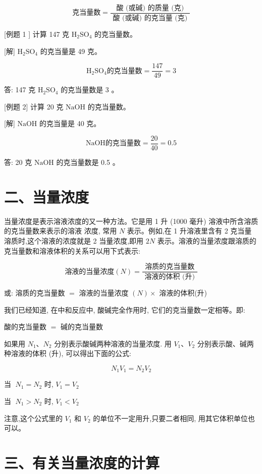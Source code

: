 \documentclass[10pt]{article}
\begin{document}
\[
\text{克当量数} = \frac{\text{ 酸 (或碱) 的质量 (克) }}{\text{ 酸 (或碱) 的克当量 (克) }}
\]

[例题 1 ] 计算 147 克 \({\mathrm{H}}_{2}{\mathrm{{SO}}}_{4}\) 的克当量数。

[解] \({\mathrm{H}}_{2}{\mathrm{{SO}}}_{4}\) 的克当量是 49 克。

\[
{\mathrm{H}}_{2}{\mathrm{{SO}}}_{4}\text{的克当量数} = \frac{147}{49} = 3
\]

答: 147 克 \({\mathrm{H}}_{2}{\mathrm{{SO}}}_{4}\) 的克当量数是 3 。

[例题 2] 计算 20 克 \(\mathrm{{NaOH}}\) 的克当量数。

[解] \(\mathrm{{NaOH}}\) 的克当量是 40 克。

\[
\mathrm{{NaOH}}\text{的克当量数} = \frac{20}{40} = {0.5}
\]

答: 20 克 \(\mathrm{{NaOH}}\) 的克当量数是 0.5 。

\section*{二、当量浓度}

当量浓度是表示溶液浓度的又一种方法。它是用 1 升 (1000 毫升) 溶液中所含溶质的克当量数来表示的溶液 浓度, 常用 \(N\) 表示。例如,在 1 升溶液里含有 2 克当量溶质时,这个溶液的浓度就是 2 当量浓度,即用 \({2N}\) 表示。溶液的当量浓度跟溶质的克当量数和溶液体积的关系可以用下式表示:

\[
\text{溶液的当量浓度}\left( N\right) = \frac{\text{ 溶质的克当量数 }}{\text{ 溶液的体积 (升) }}
\]

或: 溶质的克当量数 \(=\) 溶液的当量浓度 \(\left( N\right) \times\) 溶液的体积(升)

我们已经知道, 在中和反应中, 酸碱完全作用时, 它们的克当量数一定相等。即:

酸的克当量数 \(=\) 碱的克当量数

如果用 \({N}_{1}\text{、}{N}_{2}\) 分别表示酸碱两种溶液的当量浓度. 用 \({V}_{1}\text{、}{V}_{2}\) 分别表示酸、碱两种溶液的体积 (升), 可以得出下面的公式:

\[
{N}_{1}{V}_{1} = {N}_{2}{V}_{2}
\]

当 \(\;{N}_{1} = {N}_{2}\) 时, \({V}_{1} = {V}_{2}\)

当 \(\;{N}_{1} > {N}_{2}\) 时, \({V}_{1} < {V}_{2}\)

注意,这个公式里的 \({V}_{1}\) 和 \({V}_{2}\) 的单位不一定用升,只要二者相同, 用其它体积单位也可以。

\section*{三、有关当量浓度的计算}
\end{document}
